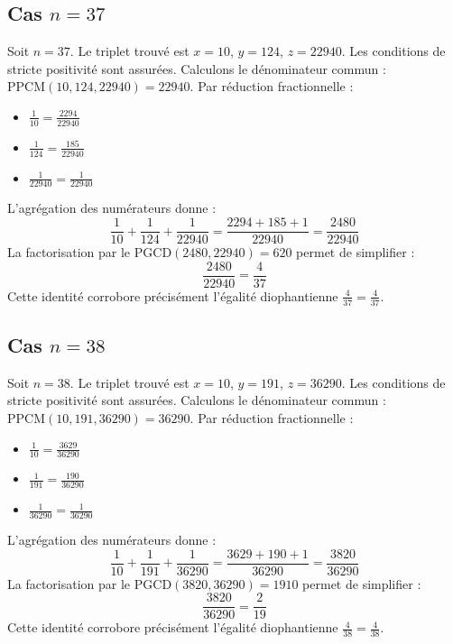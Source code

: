 \documentclass[11pt,a4paper]{article}
\begin{document}
\subsection{Cas $n = 37$}
Soit $n = 37$. Le triplet trouvé est $x = 10$, $y = 124$, $z = 22940$.
Les conditions de stricte positivité sont assurées.
Calculons le dénominateur commun : $\text{PPCM}(10, 124, 22940) = 22940$.
Par réduction fractionnelle :
\begin{itemize}
    \item $\frac{1}{10} = \frac{2294}{22940}$
    \item $\frac{1}{124} = \frac{185}{22940}$
    \item $\frac{1}{22940} = \frac{1}{22940}$
\end{itemize}
L'agrégation des numérateurs donne :
$$ \frac{1}{10} + \frac{1}{124} + \frac{1}{22940} = \frac{2294 + 185 + 1}{22940} = \frac{2480}{22940} $$
La factorisation par le $\text{PGCD}(2480, 22940) = 620$ permet de simplifier :
$$ \frac{2480}{22940} = \frac{4}{37} $$
Cette identité corrobore précisément l'égalité diophantienne $\frac{4}{37} = \frac{4}{37}$.

\subsection{Cas $n = 38$}
Soit $n = 38$. Le triplet trouvé est $x = 10$, $y = 191$, $z = 36290$.
Les conditions de stricte positivité sont assurées.
Calculons le dénominateur commun : $\text{PPCM}(10, 191, 36290) = 36290$.
Par réduction fractionnelle :
\begin{itemize}
    \item $\frac{1}{10} = \frac{3629}{36290}$
    \item $\frac{1}{191} = \frac{190}{36290}$
    \item $\frac{1}{36290} = \frac{1}{36290}$
\end{itemize}
L'agrégation des numérateurs donne :
$$ \frac{1}{10} + \frac{1}{191} + \frac{1}{36290} = \frac{3629 + 190 + 1}{36290} = \frac{3820}{36290} $$
La factorisation par le $\text{PGCD}(3820, 36290) = 1910$ permet de simplifier :
$$ \frac{3820}{36290} = \frac{2}{19} $$
Cette identité corrobore précisément l'égalité diophantienne $\frac{4}{38} = \frac{4}{38}$.
\end{document}

